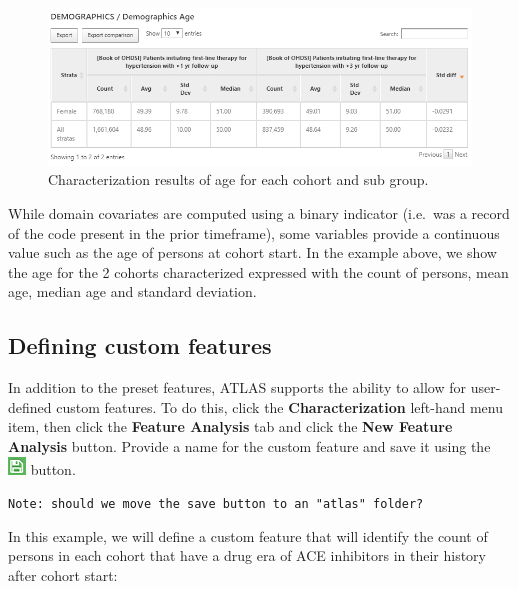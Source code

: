 \documentclass[11pt]{book}
\theoremstyle{definition}
\theoremstyle{definition}
\theoremstyle{definition}
\theoremstyle{remark}
\begin{document}
\begin{figure}

{\centering \includegraphics[width=1\linewidth]{images/Characterization/atlasCharacterizationResultsContinuous} 

}

\caption{Characterization results of age for each cohort and sub group.}\label{fig:atlasCharacterizationResultsContinuous}
\end{figure}

While domain covariates are computed using a binary indicator (i.e.~was a record of the code present in the prior timeframe), some variables provide a continuous value such as the age of persons at cohort start. In the example above, we show the age for the 2 cohorts characterized expressed with the count of persons, mean age, median age and standard deviation.

\hypertarget{defining-custom-features}{%
\subsection{Defining custom features}\label{defining-custom-features}}

In addition to the preset features, ATLAS supports the ability to allow for user-defined custom features. To do this, click the \textbf{Characterization} left-hand menu item, then click the \textbf{Feature Analysis} tab and click the \textbf{New Feature Analysis} button. Provide a name for the custom feature and save it using the \includegraphics{images/PopulationLevelEstimation/save.png} button.

\texttt{Note:\ should\ we\ move\ the\ save\ button\ to\ an\ "atlas"\ folder?}

In this example, we will define a custom feature that will identify the count of persons in each cohort that have a drug era of ACE inhibitors in their history after cohort start:
\end{document}
